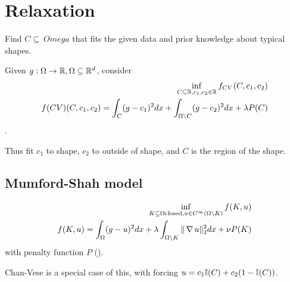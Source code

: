 \chapter{Relaxation}
\label{cha:relaxation}

\begin{exmp}[Segmentation]
  \label{defn:relaxation:1}
  Find $C \subseteq\ Omega$ that fits the given data and prior
  knowledge about typical shapes.
\end{exmp}

\begin{thm}
  \label{defn:relaxation:2}
  Given $g: \Omega \rightarrow \mathbb{R}, \Omega \subseteq \mathbb{R}^{d}$, consider
  \begin{align}
    \label{eq:110}
    \inf_{C \subseteq \mathbb{R}, c_{1}, c_{2} \in \mathbb{R}} f_{CV}(C, c_{1}, c_{2})
  \\
  f(CV)(C, c_{1}, c_{2}) = \int_{C}(g - c_{1})^{2} dx + \int_{\Omega
    \backslash C} (g -
  c_{2})^{2} dx + \lambda P(C)
  \end{align}
  .

  Thus fit $c_{1}$ to shape, $c_{2}$ to outside of shape, and $C$ is
  the region of the shape.
\end{thm}

\section{Mumford-Shah model}
\label{sec:mumford-shah-model}

\begin{align}
  \label{eq:111}
  \inf_{K \subseteq \Omega \text{closed}, u \in C^{\infty}(\Omega
    \backslash K)} f(K, u) \\
  f(K, u) = \int_{\Omega} (g - u)^{2} dx + \lambda \int_{\Omega
    \backslash K} \| \operatorname*{\nabla} u \|_{2}^{2} dx + \nu P(K)
\end{align} with penalty function $P$ ().

Chan-Vese is a special case of this, with forcing $u = c_{1} \I{C} +
c_{2}(1 - \I{C})$.

